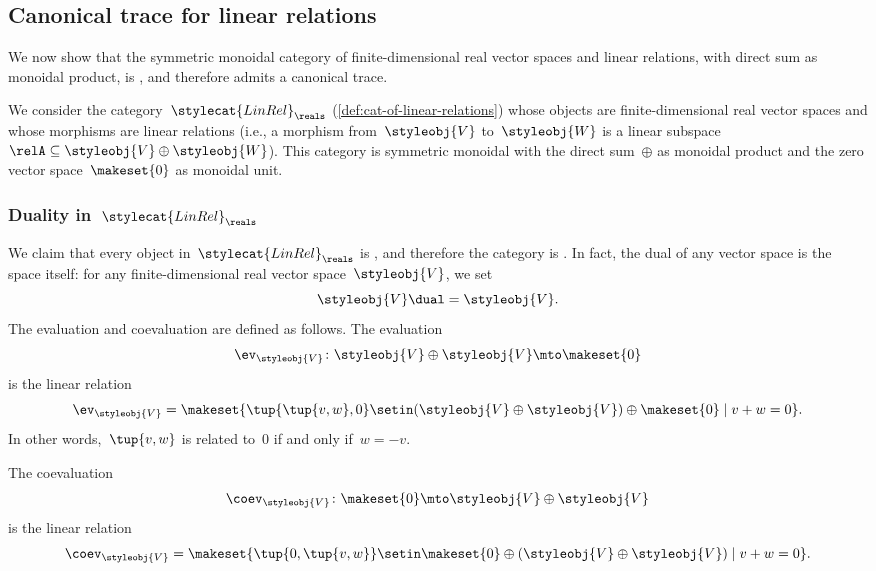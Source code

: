 \subsection{Canonical trace for linear relations}

We now show that the symmetric monoidal category of finite-dimensional real vector spaces and linear relations, with direct sum as monoidal product, is , and therefore admits a canonical trace.

We consider the category~$\stylecat{LinRel}_\reals$ (\cref{def:cat-of-linear-relations}) whose objects are finite-dimensional real vector spaces and whose morphisms are linear relations (i.e., a morphism from~$\styleobj{V}$ to~$\styleobj{W}$ is a linear subspace~$\relA \subseteq \styleobj{V} \oplus \styleobj{W}$).
This category is symmetric monoidal with the direct sum~$\oplus$ as monoidal product and the zero vector space~$\makeset{0}$ as monoidal unit.

\subsubsection{Duality in~$\stylecat{LinRel}_\reals$}

We claim that every object in~$\stylecat{LinRel}_\reals$ is , and therefore the category is .
In fact, the dual of any vector space is the space itself: for any finite-dimensional real vector space~$\styleobj{V}$, we set
\begin{equation}
    \styleobj{V}\dual = \styleobj{V}.
\end{equation}
The evaluation and coevaluation are defined as follows.
The evaluation
\begin{equation}
    \ev_\styleobj{V} \colon \styleobj{V} \oplus \styleobj{V} \mto \makeset{0}
\end{equation}
is the linear relation
\begin{equation}
    \ev_\styleobj{V} = \makeset{ \tup{\tup{v, w}, 0} \setin (\styleobj{V} \oplus \styleobj{V}) \oplus \makeset{0} \mid v + w = 0 }.
\end{equation}
In other words,~$\tup{v,w}$ is related to~$0$ if and only if~$w = -v$.

The coevaluation
\begin{equation}
    \coev_\styleobj{V} \colon \makeset{0} \mto \styleobj{V} \oplus \styleobj{V}
\end{equation}
is the linear relation
\begin{equation}
    \coev_\styleobj{V} = \makeset{ \tup{0, \tup{v, w}} \setin \makeset{0} \oplus (\styleobj{V} \oplus \styleobj{V}) \mid v + w = 0 }.
\end{equation}

